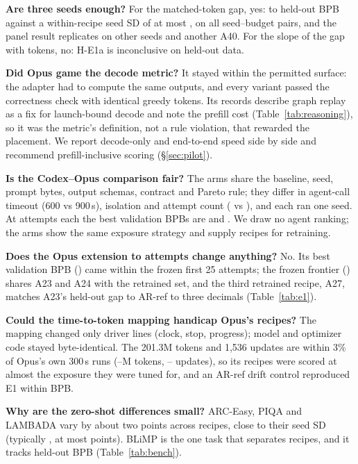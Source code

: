\documentclass{article}
\begin{document}
\textbf{Are three seeds enough?} For the matched-token gap, yes: \CREOneMatchedLo{} to \CREOneMatchedHi{} held-out BPB against a within-recipe seed SD of at most \CREOneMaxSD, on all \CREOnePairs{} seed--budget pairs, and the panel result replicates on other seeds and another A40. For the slope of the gap with tokens, no: H-E1a is inconclusive on held-out data.

\textbf{Did Opus game the decode metric?} It stayed within the permitted surface: the adapter had to compute the same outputs, and every variant passed the correctness check with identical greedy tokens. Its records describe graph replay as a fix for launch-bound decode and note the prefill cost (Table~\ref{tab:reasoning}), so it was the metric's definition, not a rule violation, that rewarded the placement. We report decode-only and end-to-end speed side by side and recommend prefill-inclusive scoring (\S\ref{sec:pilot}).

\textbf{Is the Codex--Opus comparison fair?} The arms share the baseline, seed, prompt bytes, output schemas, contract and Pareto rule; they differ in agent-call timeout (600 vs 900\,s), isolation and attempt count (\CRCxAttempts{} vs \CROpAttempts), and each ran one seed. At \CRCxAttempts{} attempts each the best validation BPBs are \CRCxBestBPB{} and \CROpBestTwentyTwo. We draw no agent ranking; the arms show the same exposure strategy and supply recipes for retraining.

\textbf{Does the Opus extension to \CROpAttempts{} attempts change anything?} No. Its best validation BPB (\CROpBestFrozen) came within the frozen first 25 attempts; the frozen frontier (\CROpFrontierFrozen) shares A23 and A24 with the retrained set, and the third retrained recipe, A27, matches A23's held-out gap to AR-ref to three decimals (Table~\ref{tab:e1}).

\textbf{Could the time-to-token mapping handicap Opus's recipes?} The mapping changed only driver lines (clock, stop, progress); model and optimizer code stayed byte-identical. The 201.3M tokens and 1{,}536 updates are within 3\% of Opus's own 300\,s runs (\CROpTokLo--\CROpTokHi M tokens, \CROpUpdLo--\CROpUpdHi{} updates), so its recipes were scored at almost the exposure they were tuned for, and an AR-ref drift control reproduced E1 within \CRMTDriftAbs{} BPB.

\textbf{Why are the zero-shot differences small?} ARC-Easy, PIQA and LAMBADA vary by about two points across recipes, close to their seed SD (typically \CRBenchSDMed, at most \CRBenchSDMax{} points). BLiMP is the one task that separates recipes, and it tracks held-out BPB (Table~\ref{tab:bench}).
\end{document}
